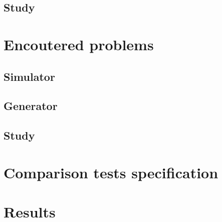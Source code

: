 \documentclass{scrartcl}
\begin{document}
\subsection{Study}

\section{Encoutered problems}

\subsection{Simulator}

\subsection{Generator}

\subsection{Study}

\section{Comparison tests specification}

\section{Results}
\end{document}
